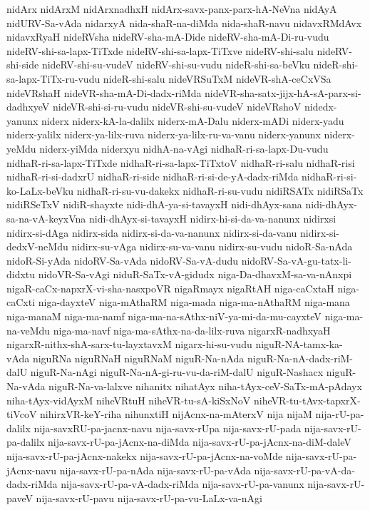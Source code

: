 {nidArx
nidArxM
nidArxnadhxH
nidArx-savx-panx-parx-hA-NeVna
nidAyA
nidURV-Sa-vAda
nidarxyA
nida-shaR-na-diMda
nida-shaR-navu
nidavxRMdAvx
nidavxRyaH
nideRVsha
nideRV-sha-mA-Dide
nideRV-sha-mA-Di-ru-vudu
nideRV-shi-sa-lapx-TiTxde
nideRV-shi-sa-lapx-TiTxve
nideRV-shi-salu
nideRV-shi-side
nideRV-shi-su-vudeV
nideRV-shi-su-vudu
nideR-shi-sa-beVku
nideR-shi-sa-lapx-TiTx-ru-vudu
nideR-shi-salu
nideVRSuTxM
nideVR-shA-ceCxVSa
nideVRshaH
nideVR-sha-mA-Di-dadx-riMda
nideVR-sha-satx-jijx-hA-sA-parx-si-dadhxyeV
nideVR-shi-si-ru-vudu
nideVR-shi-su-vudeV
nideVRshoV
nidedx-yanunx
niderx
niderx-kA-la-dalilx
niderx-mA-Dalu
niderx-mADi
niderx-yadu
niderx-yalilx
niderx-ya-lilx-ruva
niderx-ya-lilx-ru-va-vanu
niderx-yanunx
niderx-yeMdu
niderx-yiMda
niderxyu
nidhA-na-vAgi
nidhaR-ri-sa-lapx-Du-vudu
nidhaR-ri-sa-lapx-TiTxde
nidhaR-ri-sa-lapx-TiTxtoV
nidhaR-ri-salu
nidhaR-risi
nidhaR-ri-si-dadxrU
nidhaR-ri-side
nidhaR-ri-si-de-yA-dadx-riMda
nidhaR-ri-si-ko-LaLx-beVku
nidhaR-ri-su-vu-dakekx
nidhaR-ri-su-vudu
nidiRSATx
nidiRSaTx
nidiRSeTxV
nidiR-shayxte
nidi-dhA-ya-si-tavayxH
nidi-dhAyx-sana
nidi-dhAyx-sa-na-vA-keyxVna
nidi-dhAyx-si-tavayxH
nidirx-hi-si-da-va-nanunx
nidirxsi
nidirx-si-dAga
nidirx-sida
nidirx-si-da-va-nanunx
nidirx-si-da-vanu
nidirx-si-dedxV-neMdu
nidirx-su-vAga
nidirx-su-va-vanu
nidirx-su-vudu
nidoR-Sa-nAda
nidoR-Si-yAda
nidoRV-Sa-vAda
nidoRV-Sa-vA-dudu
nidoRV-Sa-vA-gu-tatx-li-didxtu
nidoVR-Sa-vAgi
niduR-SaTx-vA-gidudx
niga-Da-dhavxM-sa-va-nAnxpi
nigaR-caCx-napxrX-vi-sha-nasxpoVR
nigaRmayx
nigaRtAH
niga-caCxtaH
niga-caCxti
niga-dayxteV
niga-mAthaRM
niga-mada
niga-ma-nAthaRM
niga-mana
niga-manaM
niga-ma-namf
niga-ma-na-sAthx-niV-ya-mi-da-mu-cayxteV
niga-ma-na-veMdu
niga-ma-navf
niga-ma-sAthx-na-da-lilx-ruva
nigarxR-nadhxyaH
nigarxR-nithx-shA-sarx-tu-layxtavxM
nigarx-hi-su-vudu
niguR-NA-tamx-ka-vAda
niguRNa
niguRNaH
niguRNaM
niguR-Na-nAda
niguR-Na-nA-dadx-riM-dalU
niguR-Na-nAgi
niguR-Na-nA-gi-ru-vu-da-riM-dalU
niguR-Nashacx
niguR-Na-vAda
niguR-Na-va-lalxve
nihanitx
nihatAyx
niha-tAyx-ceV-SaTx-mA-pAdayx
niha-tAyx-vidAyxM
niheVRtuH
niheVR-tu-sA-kiSxNoV
niheVR-tu-tAvx-tapxrX-tiVcoV
nihirxVR-keY-riha
nihunxtiH
nijAcnx-na-mAterxV
nija
nijaM
nija-rU-pa-dalilx
nija-savxRU-pa-jacnx-navu
nija-savx-rUpa
nija-savx-rU-pada
nija-savx-rU-pa-dalilx
nija-savx-rU-pa-jAcnx-na-diMda
nija-savx-rU-pa-jAcnx-na-diM-daleV
nija-savx-rU-pa-jAcnx-nakekx
nija-savx-rU-pa-jAcnx-na-voMde
nija-savx-rU-pa-jAcnx-navu
nija-savx-rU-pa-nAda
nija-savx-rU-pa-vAda
nija-savx-rU-pa-vA-da-dadx-riMda
nija-savx-rU-pa-vA-dadx-riMda
nija-savx-rU-pa-vanunx
nija-savx-rU-paveV
nija-savx-rU-pavu
nija-savx-rU-pa-vu-LaLx-va-nAgi
}
